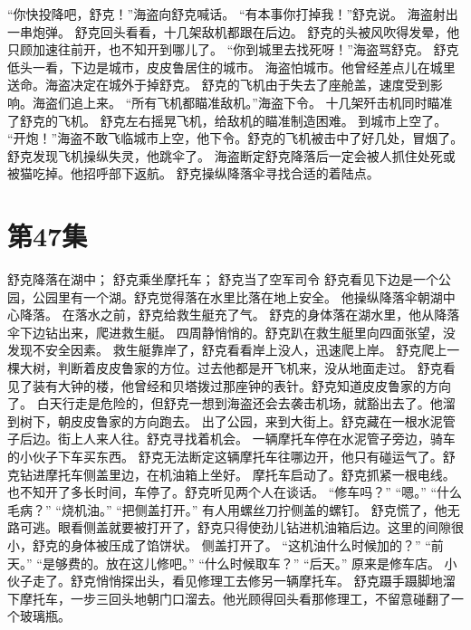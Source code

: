 \documentclass[a4paper,12pt,UTF8,twoside]{ctexbook}
\begin{document}
        “你快投降吧，舒克！”海盗向舒克喊话。 
        “有本事你打掉我！”舒克说。 
        海盗射出一串炮弹。 
        舒克回头看看，十几架敌机都跟在后边。 
        舒克的头被风吹得发晕，他只顾加速往前开，也不知开到哪儿了。 
        “你到城里去找死呀！”海盗骂舒克。 
        舒克低头一看，下边是城市，皮皮鲁居住的城市。 
        海盗怕城市。他曾经差点儿在城里送命。海盗决定在城外于掉舒克。 
        舒克的飞机由于失去了座舱盖，速度受到影响。海盗们追上来。 
        “所有飞机都瞄准敌机。”海盗下令。 
        十几架歼击机同时瞄准了舒克的飞机。 
        舒克左右摇晃飞机，给敌机的瞄准制造困难。 
        到城市上空了。 
        “开炮！”海盗不敢飞临城市上空，他下令。舒克的飞机被击中了好几处，冒烟了。舒克发现飞机操纵失灵，他跳伞了。 
        海盗断定舒克降落后一定会被人抓住处死或被猫吃掉。他招呼部下返航。 
        舒克操纵降落伞寻找合适的着陆点。   \chapter{第47集} 
        舒克降落在湖中； 
        舒克乘坐摩托车； 
        舒克当了空军司令   
        舒克看见下边是一个公园，公园里有一个湖。舒克觉得落在水里比落在地上安全。 
        他操纵降落伞朝湖中心降落。 
        在落水之前，舒克给救生艇充了气。 
        舒克的身体落在湖水里，他从降落伞下边钻出来，爬进救生艇。 
        四周静悄悄的。舒克趴在救生艇里向四面张望，没发现不安全因素。 
        救生艇靠岸了，舒克看看岸上没人，迅速爬上岸。 
        舒克爬上一棵大树，判断着皮皮鲁家的方位。过去他都是开飞机来，没从地面走过。 
        舒克看见了装有大钟的楼，他曾经和贝塔拨过那座钟的表针。舒克知道皮皮鲁家的方向了。 
        白天行走是危险的，但舒克一想到海盗还会去袭击机场，就豁出去了。他溜到树下，朝皮皮鲁家的方向跑去。 
        出了公园，来到大街上。舒克藏在一根水泥管子后边。街上人来人往。舒克寻找着机会。 
        一辆摩托车停在水泥管子旁边，骑车的小伙子下车买东西。 
        舒克无法断定这辆摩托车往哪边开，他只有碰运气了。舒克钻进摩托车侧盖里边，在机油箱上坐好。 
        摩托车启动了。舒克抓紧一根电线。 
        也不知开了多长时间，车停了。舒克听见两个人在谈话。 
        “修车吗？” 
        “嗯。” 
        “什么毛病？” 
        “烧机油。” 
        “把侧盖打开。” 
        有人用螺丝刀拧侧盖的螺钉。 
        舒克慌了，他无路可逃。眼看侧盖就要被打开了，舒克只得使劲儿钻进机油箱后边。这里的间隙很小，舒克的身体被压成了馅饼状。 
        侧盖打开了。 
        “这机油什么时候加的？” 
        “前天。” 
        “是够费的。放在这儿修吧。” 
        “什么时候取车？” 
        “后天。” 
        原来是修车店。 
        小伙子走了。舒克悄悄探出头，看见修理工去修另一辆摩托车。 
        舒克蹑手蹑脚地溜下摩托车，一步三回头地朝门口溜去。他光顾得回头看那修理工，不留意碰翻了一个玻璃瓶。 
\end{document}
